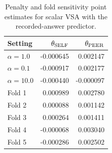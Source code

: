 \begin{table}[!htbp]
\centering\small
\caption{Penalty and fold sensitivity point estimates for scalar VSA with the recorded-answer predictor.}
\label{tab:original_sensitivity}
\renewcommand{\arraystretch}{1.25}
\begin{tabular}{@{}lrr@{}}
\toprule
Setting & $\theta_{\rm SELF}$ & $\theta_{\rm PEER}$\\
\midrule
$\alpha=1.0$ & -0.000645 & 0.002147\\
$\alpha=0.1$ & -0.000917 & 0.002177\\
$\alpha=10.0$ & -0.000440 & -0.000097\\
Fold 1 & 0.000989 & 0.002780\\
Fold 2 & 0.000088 & 0.001142\\
Fold 3 & 0.000264 & 0.001411\\
Fold 4 & -0.000068 & 0.003040\\
Fold 5 & -0.000286 & 0.002502\\
\bottomrule
\end{tabular}
\end{table}
